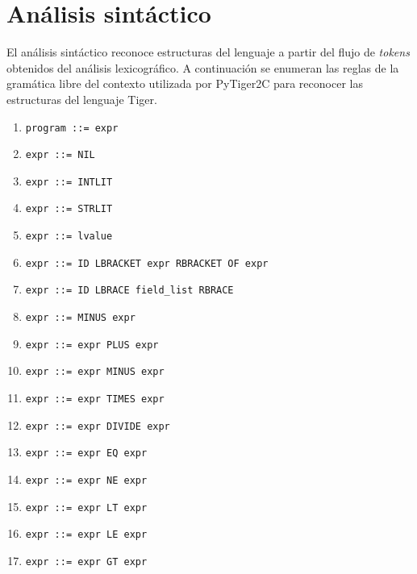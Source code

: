 \documentclass{article}
\begin{document}
\section{Análisis sintáctico}

El análisis sintáctico reconoce estructuras del lenguaje a partir del flujo de
\emph{tokens} obtenidos del análisis lexicográfico. A continuación se enumeran
las reglas de la gramática libre del contexto utilizada por PyTiger2C para
reconocer las estructuras del lenguaje Tiger.

\begin{enumerate}

  \item \verb|program ::= expr|

  \item \verb|expr ::= NIL|

  \item \verb|expr ::= INTLIT|

  \item \verb|expr ::= STRLIT|

  \item \verb|expr ::= lvalue|

  \item \verb|expr ::= ID LBRACKET expr RBRACKET OF expr|

  \item \verb|expr ::= ID LBRACE field_list RBRACE|

  \item \verb|expr ::= MINUS expr|

  \item \verb|expr ::= expr PLUS expr|

  \item \verb|expr ::= expr MINUS expr|

  \item \verb|expr ::= expr TIMES expr|

  \item \verb|expr ::= expr DIVIDE expr|

  \item \verb|expr ::= expr EQ expr|

  \item \verb|expr ::= expr NE expr|

  \item \verb|expr ::= expr LT expr|

  \item \verb|expr ::= expr LE expr|

  \item \verb|expr ::= expr GT expr|


\end{enumerate}
\end{document}
